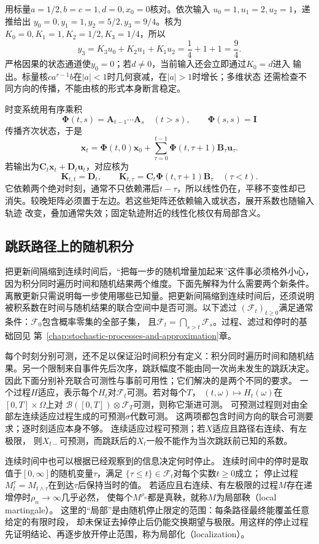 用标量$a=1/2,b=c=1,d=0,x_0=0$核对。依次输入
$u_0=1,u_1=2,u_2=1$，递推给出
$y_0=0,y_1=1,y_2=5/2,y_3=9/4$。核为
$K_0=0,K_1=1,K_2=1/2,K_3=1/4$，所以
\[
  y_3=K_3u_0+K_2u_1+K_1u_2=\frac14+1+1=\frac94.
\]
严格因果的状态通道使$y_0=0$；若$d\neq0$，当前输入还会立即通过$K_0=d$进入
输出。标量核$ca^{r-1}b$在$|a|<1$时几何衰减，在$|a|>1$时增长；多维状态
还需检查不同方向的传播，不能由核的形式本身断言稳定。

时变系统用有序乘积
\[
  \bm\Phi(t,s)=\bm A_{t-1}\cdots\bm A_s\quad(t>s),\qquad
  \bm\Phi(s,s)=\bm I
\]
传播齐次状态，于是
\[
  \bm x_t=\bm\Phi(t,0)\bm x_0+
    \sum_{\tau=0}^{t-1}\bm\Phi(t,\tau+1)\bm B_\tau\bm u_\tau.
\]
若输出为$\bm C_t\bm x_t+\bm D_t\bm u_t$，对应核为
\[
  \bm K_{t,t}=\bm D_t,\qquad
  \bm K_{t,\tau}=\bm C_t\bm\Phi(t,\tau+1)\bm B_\tau\quad(\tau<t).
\]
它依赖两个绝对时刻，通常不只依赖滞后$t-\tau$，所以线性仍在，平移不变性却已
消失。较晚矩阵必须置于左边。若这些矩阵还依赖输入或状态，展开系数也随输入轨迹
改变，叠加通常失效；固定轨迹附近的线性化核仅有局部含义。


\subsection{跳跃路径上的随机积分}
\label{sec:action-state-poisson-integral}

把更新间隔缩到连续时间后，“把每一步的随机增量加起来”这件事必须格外小心，因为积分同时遍历时间和随机结果两个维度。下面先解释为什么需要两个新条件。
离散更新只需说明每一步使用哪些已知量。把更新间隔缩到连续时间后，还须说明
被积系数在时间与随机结果的联合空间中是否可测。以下滤过
$(\mathcal F_t)_{t\geq0}$满足通常条件：$\mathcal F_0$包含概率零集的全部子集，
且$\mathcal F_t=\bigcap_{s>t}\mathcal F_s$。过程、滤过和停时的基础回见
第~\ref{chap:stochastic-processes-and-approximation}章。

每个时刻分别可测，还不足以保证沿时间积分有定义：积分同时遍历时间和随机结果。另一个限制来自事件先后次序，跳跃幅度不能由同一次尚未发生的跳跃决定。因此下面分别补充联合可测性与事前可用性；它们解决的是两个不同的要求。
一个过程$H$适应，表示每个$H_t$对$\mathcal F_t$可测。若对每个$T$，
$(t,\omega)\mapsto H_t(\omega)$在$[0,T]\times\Omega$上对
$\mathcal B([0,T])\otimes\mathcal F_T$可测，则称它渐进可测。
可预测过程则对由全部左连续适应过程生成的可预测$\sigma$代数可测。
这两项都包含时间方向的联合可测要求；逐时刻适应本身不够。
连续适应过程可预测；若$X$适应且路径右连续、有左极限，
则$X_{t-}$可预测，而跳跃后的$X_t$一般不能作为当次跳跃前已知的系数。

连续时间中也可以根据已经观察到的信息决定何时停止。
连续时间中的停时是取值于$[0,\infty]$的随机变量$\tau$，满足
$\{\tau\leq t\}\in\mathcal F_t$对每个实数$t\geq0$成立；
停止过程$M^\tau_t=M_{t\wedge\tau}$在到达$\tau$后保持当时的值。
若适应且右连续、有左极限的过程$M$存在递增停时$\rho_n\to\infty$几乎必然，
使每个$M^{\rho_n}$都是真鞅，就称$M$为局部鞅（local martingale）。
这里的“局部”是由随机停止限定的范围：每条路径最终能覆盖任意给定的有限时段，
却未保证去掉停止后仍能交换期望与极限。用这样的停止过程先证明结论、再逐步放开停止范围，称为局部化（localization）。

